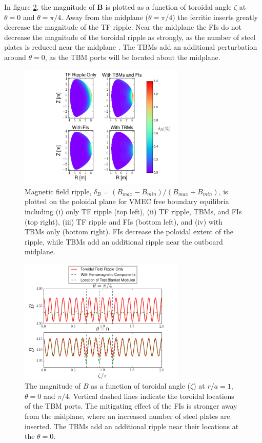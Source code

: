 \documentclass{article}
\numberwithin{figure}{section}
\numberwithin{equation}{section}
\begin{document}
In figure \ref{fig:toroidalripple}, the magnitude of $\bm{B}$ is plotted as a function of toroidal angle $\zeta$ at $\theta = 0$ and $\theta = \pi/4$. Away from the midplane ($\theta = \pi/4$) the ferritic inserts greatly decrease the magnitude of the TF ripple. Near the midplane the FIs do not decrease the magnitude of the toroidal ripple as strongly, as the number of steel plates is reduced near the midplane \cite{Shinohara2009}. The TBMs add an additional perturbation around $\theta = 0$, as the TBM ports will be located about the midplane. 

\FloatBarrier

\begin{figure}[h!]
\centering
\includegraphics[width=0.7\textwidth]{ripplecontour.png}
\caption{\label{fig:ripplecontour} Magnetic field ripple, $\delta_B = (B_{max}-B_{min})/(B_{max} + B_{min})$, is plotted on the poloidal plane for VMEC free boundary equilibria including (i) only TF ripple (top left), (ii) TF ripple, TBMs, and FIs (top right), (iii) TF ripple and FIs (bottom left), and (iv) with TBMs only (bottom right). FIs decrease the poloidal extent of the ripple, while TBMs add an additional ripple near the outboard midplane.}
\end{figure}

\begin{figure}[h!]
\centering
\includegraphics[width=0.7\textwidth]{toroidalripple.png}
\caption{\label{fig:toroidalripple} The magnitude of $B$ as a function of toroidal angle ($\zeta$) at $r/a = 1$, $\theta = 0$ and $\pi/4$. Vertical dashed lines indicate the toroidal locations of the TBM ports. The mitigating effect of the FIs is stronger away from the midplane, where an increased number of steel plates are inserted. The TBMs add an additional ripple near their locations at the $\theta = 0$. }
\end{figure}
\end{document}
